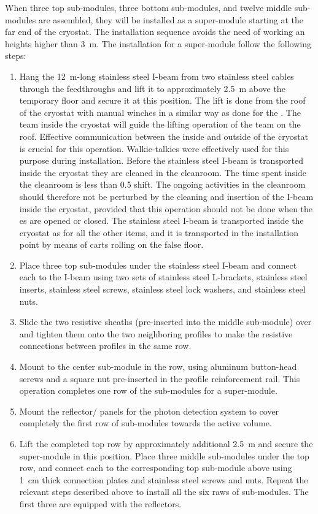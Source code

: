 When three top sub-modules, three bottom sub-modules, and twelve middle sub-modules are assembled, they will be installed as a super-module starting at the far end of the cryostat.
The installation sequence avoids the need of working an heights higher than 3~m.
The installation for a super-module follow the following steps:
\begin{enumerate}
\item Hang the 12~m-long stainless steel I-beam from two stainless steel cables through the feedthroughs and lift it to approximately 2.5~m above the temporary floor and secure it at this position.
The lift is done from the roof of the cryostat with manual winches in a similar way as done for the .
The team inside the cryostat will guide the lifting operation of the team on the roof.
Effective communication between the inside and outside of the cryostat is crucial for this operation.
Walkie-talkies were effectively used for this purpose during  installation.
Before the stainless steel I-beam is transported inside the cryostat they are cleaned in the cleanroom.
The time spent inside the cleanroom is less than 0.5 shift.
The ongoing activities in the cleanroom should therefore not be perturbed by the cleaning and insertion of the I-beam inside the cryostat, provided that this operation should not be done when the  \coldbox{}es are opened or closed.
The stainless steel I-beam is transported inside the cryostat as for all the other items, and it is transported in the installation point by means of carts rolling on the false floor.
\item Place three top sub-modules under the stainless steel I-beam and connect each to the I-beam using two sets of stainless steel L-brackets, stainless steel inserts, stainless steel screws, stainless steel lock washers, and stainless steel nuts.
\item Slide the two resistive sheaths (pre-inserted into the middle sub-module) over and tighten them onto the two neighboring profiles to make the resistive connections between profiles in the same row.
\item Mount  to the center sub-module in the row, using aluminum button-head screws and a square nut pre-inserted in the profile reinforcement rail.
This operation completes one row of the sub-modules for a super-module.
\item Mount the reflector/ panels for the photon detection system to cover completely the first row of sub-modules towards the active volume.
\item Lift the completed top row by approximately additional 2.5~m and secure the super-module in this position.
Place three middle sub-modules under the top row, and connect each to the corresponding top sub-module above using 1~cm thick connection plates and stainless steel screws and nuts.
Repeat the relevant steps described above to install all the six raws of sub-modules.
The first three are equipped with the reflectors.
\end{enumerate}

